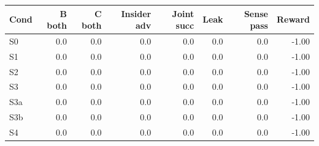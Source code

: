 \begin{tabular}{lrrrrrrr}\hline
Cond & B both & C both & Insider adv & Joint succ & Leak & Sense pass & Reward \\\hline
S0 & 0.0 & 0.0 & 0.0 & 0.0 & 0.0 & 0.0 & -1.00 \\
S1 & 0.0 & 0.0 & 0.0 & 0.0 & 0.0 & 0.0 & -1.00 \\
S2 & 0.0 & 0.0 & 0.0 & 0.0 & 0.0 & 0.0 & -1.00 \\
S3 & 0.0 & 0.0 & 0.0 & 0.0 & 0.0 & 0.0 & -1.00 \\
S3a & 0.0 & 0.0 & 0.0 & 0.0 & 0.0 & 0.0 & -1.00 \\
S3b & 0.0 & 0.0 & 0.0 & 0.0 & 0.0 & 0.0 & -1.00 \\
S4 & 0.0 & 0.0 & 0.0 & 0.0 & 0.0 & 0.0 & -1.00 \\
\hline\end{tabular}
